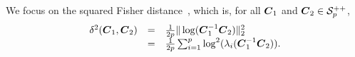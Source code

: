 \documentclass{article}
\theoremstyle{plain}
\theoremstyle{definition}
\theoremstyle{remark}
\begin{document}
We focus on the squared Fisher distance~\cite{skovgaard1984riemannian}, which is, for all $\boldsymbol{C}_1$ and $\boldsymbol{C}_2\in\mathcal{S}^{++}_{p}$,
\begin{equation}
    \begin{array}{rcl}
        \delta^2(\boldsymbol{C}_1,\boldsymbol{C}_2) & = & \frac1{2p}\| \log(\boldsymbol{C}_1^{-1}\boldsymbol{C}_2) \|_2^2  \\
         & = & \frac1{2p}\sum_{i=1}^{p} \log^2(\lambda_i(\boldsymbol{C}_1^{-1}\boldsymbol{C}_2)).
    \end{array}
\label{eq:Fisher_dist}
\end{equation}
\end{document}
